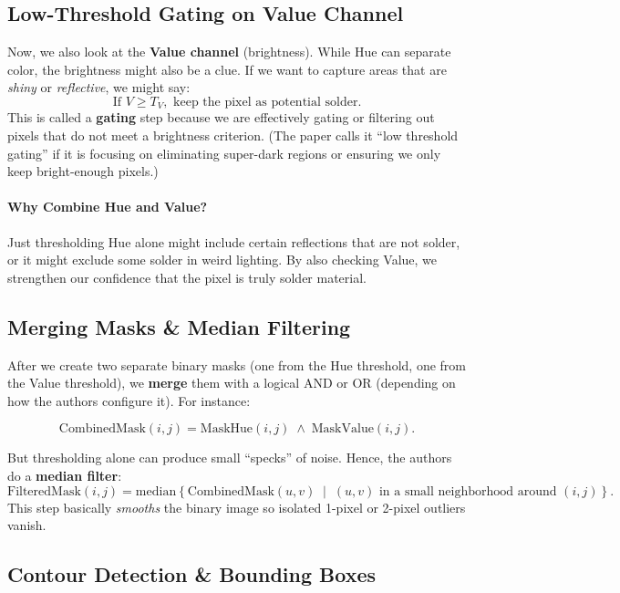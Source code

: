 \documentclass{article}
\begin{document}
\subsection{Low-Threshold Gating on Value Channel }

Now, we also look at the \textbf{Value channel} (brightness). 
While Hue can separate color, the brightness might also be a clue. 
If we want to capture areas that are \emph{shiny} or \emph{reflective}, we might say: 
\[
   \text{If }V \geq T_V,\text{ keep the pixel as potential solder.}
\]
This is called a \textbf{gating} step because we are effectively gating or filtering out pixels that do not meet a brightness criterion. 
(The paper calls it ``low threshold gating'' if it is focusing on eliminating super-dark regions or ensuring we only keep bright-enough pixels.)

\paragraph{Why Combine Hue and Value?}
Just thresholding Hue alone might include certain reflections that are not solder, or it might exclude some solder in weird lighting. 
By also checking Value, we strengthen our confidence that the pixel is truly solder material. 

\subsection{Merging Masks \& Median Filtering }
\label{sec:maskmerge}

After we create two separate binary masks (one from the Hue threshold, one from the Value threshold), 
we \textbf{merge} them with a logical AND or OR (depending on how the authors configure it). 
For instance:

\[
   \text{CombinedMask}(i,j) 
   = \text{MaskHue}(i,j) \;\wedge\; \text{MaskValue}(i,j).
\]

But thresholding alone can produce small ``specks'' of noise. 
Hence, the authors do a \textbf{median filter}: 
\[
   \text{FilteredMask}(i,j) 
   = \mathrm{median}
   \left\{
      \text{CombinedMask}(u,v)\;\mid\;
      (u,v)\text{ in a small neighborhood around }(i,j)
   \right\}.
\]
This step basically \emph{smooths} the binary image so isolated 1-pixel or 2-pixel outliers vanish.

\subsection{Contour Detection \& Bounding Boxes }
\end{document}
